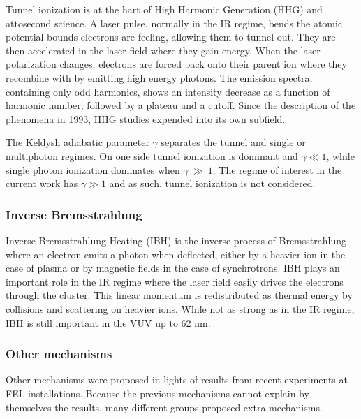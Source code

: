 Tunnel ionization is at the hart of High Harmonic Generation (HHG) and
attosecond science\cite{Fennel2010}. A laser pulse, normally in the IR regime,
bends the atomic potential bounds electrons are feeling, allowing them to tunnel
out. They are then accelerated in the laser field where they gain energy. When
the laser polarization changes, electrons are forced back onto their parent ion
where they recombine with by emitting high energy photons. The emission spectra,
containing only odd harmonics, shows an intensity decrease as a function of
harmonic number, followed by a plateau and a cutoff. Since the description
of the phenomena in 1993\cite{Corkum1993}, HHG studies expended into its own
subfield.

The Keldysh adiabatic parameter $\gamma$ separates the tunnel and single or
multiphoton regimes\cite{Fennel2010}.
On one side tunnel ionization is dominant and $\gamma \ll 1$, while single
photon ionization dominates when $\gamma~\gg~1$. The regime of interest in the
current work has $\gamma \gg 1$ and as such, tunnel ionization is not
considered.



\subsubsection{Inverse Bremsstrahlung}
Inverse Bremsstrahlung Heating (IBH) is the inverse process of Bremsstrahlung
where an electron emits a photon when deflected, either by a heavier ion in the
case of plasma or by magnetic fields in the case of synchrotrons. IBH plays an
important role in the IR regime\cite{Fennel2010} where the laser field easily
drives the electrons through the cluster. This linear momentum is redistributed
as thermal energy by collisions and scattering on heavier ions. While not as
strong as in the IR regime, IBH is still important in the VUV\cite{Krainov2000}
up to 62 nm\cite{Georgescu2007}.




\subsubsection{Other mechanisms}
Other mechanisms were proposed in lights of results from recent experiments at
FEL installations\cite{Wabnitz2002}. Because the previous mechanisms cannot
explain by themselves
the results, many different groups proposed extra mechanisms.


